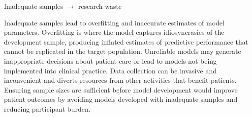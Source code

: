 \documentclass[11pt]{beamer}
\begin{document}
\begin{frame}[t]{Inadequate samples $\rightarrow$ research waste}

    Inadequate samples lead to overfitting and inaccurate estimates of model
    parameters. Overfitting is where the model captures idiosyncrasies of the
    development sample, producing inflated estimates of predictive performance
    that cannot be replicated in the target population. Unreliable models may
    generate inappropriate decisions about patient care or lead to models not
    being implemented into clinical practice. Data collection can be invasive
    and inconvenient and diverts resources from other activities that benefit
    patients. Ensuring sample sizes are sufficient before model development
    would improve patient outcomes by avoiding models developed with inadequate
    samples and reducing participant burden.

\end{frame}
\end{document}
